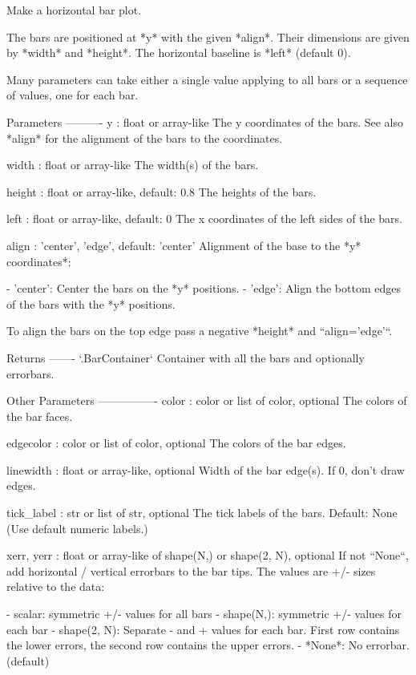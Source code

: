 \begin{DoxyVerb}Make a horizontal bar plot.

The bars are positioned at *y* with the given *align*\ment. Their
dimensions are given by *width* and *height*. The horizontal baseline
is *left* (default 0).

Many parameters can take either a single value applying to all bars
or a sequence of values, one for each bar.

Parameters
----------
y : float or array-like
    The y coordinates of the bars. See also *align* for the
    alignment of the bars to the coordinates.

width : float or array-like
    The width(s) of the bars.

height : float or array-like, default: 0.8
    The heights of the bars.

left : float or array-like, default: 0
    The x coordinates of the left sides of the bars.

align : {'center', 'edge'}, default: 'center'
    Alignment of the base to the *y* coordinates*:

    - 'center': Center the bars on the *y* positions.
    - 'edge': Align the bottom edges of the bars with the *y*
      positions.

    To align the bars on the top edge pass a negative *height* and
    ``align='edge'``.

Returns
-------
`.BarContainer`
    Container with all the bars and optionally errorbars.

Other Parameters
----------------
color : color or list of color, optional
    The colors of the bar faces.

edgecolor : color or list of color, optional
    The colors of the bar edges.

linewidth : float or array-like, optional
    Width of the bar edge(s). If 0, don't draw edges.

tick_label : str or list of str, optional
    The tick labels of the bars.
    Default: None (Use default numeric labels.)

xerr, yerr : float or array-like of shape(N,) or shape(2, N), optional
    If not ``None``, add horizontal / vertical errorbars to the
    bar tips. The values are +/- sizes relative to the data:

    - scalar: symmetric +/- values for all bars
    - shape(N,): symmetric +/- values for each bar
    - shape(2, N): Separate - and + values for each bar. First row
      contains the lower errors, the second row contains the upper
      errors.
    - *None*: No errorbar. (default)


\end{DoxyVerb}
